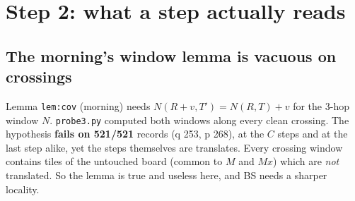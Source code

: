 \documentclass[11pt]{article}
\theoremstyle{definition}\newtheorem{definition}[theorem]{Definition}\newtheorem{remark}[theorem]{Remark}
\begin{document}
\section{Step 2: what a step actually reads}
\subsection{The morning's window lemma is vacuous on crossings}
Lemma \texttt{lem:cov} (morning) needs $N(R+v,T')=N(R,T)+v$ for the 3-hop window $N$. \texttt{probe3.py} computed both windows along every clean crossing.
The hypothesis \textbf{fails on 521/521} records (q 253, p 268), at the $C$ steps and at the last step alike, yet the steps themselves are translates.
Every crossing window contains tiles of the untouched board (common to $M$ and $Mx$) which are \emph{not} translated. So the lemma is true and useless here, and BS needs a sharper locality.
\end{document}

